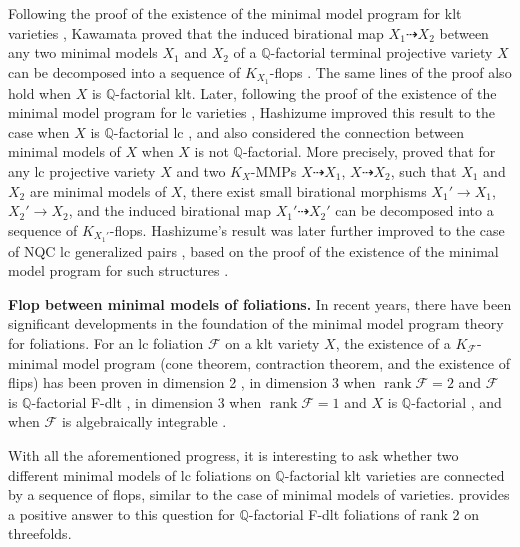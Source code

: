 \documentclass[11pt]{amsart}
\numberwithin{equation}{section}
\newcommand{\rk}{\operatorname{rank}}
\newcommand{\Ff}{\mathcal{F}}
\theoremstyle{definition}
\theoremstyle{definition}
\theoremstyle{definition}
\begin{document}
Following the proof of the existence of the minimal model program for klt varieties \cite{BCHM10}, Kawamata proved that the induced birational map $X_1 \dashrightarrow X_2$ between any two minimal models $X_1$ and $X_2$ of a $\mathbb{Q}$-factorial terminal projective variety $X$ can be decomposed into a sequence of $K_{X_1}$-flops \cite[Theorem 1]{Kaw08}. The same lines of the proof also hold when $X$ is $\mathbb{Q}$-factorial klt. Later, following the proof of the existence of the minimal model program for lc varieties \cite{Bir12, HX13, Has19}, Hashizume improved this result to the case when $X$ is $\mathbb{Q}$-factorial lc \cite{Has20}, and also considered the connection between minimal models of $X$ when $X$ is not $\mathbb{Q}$-factorial. More precisely, \cite[Theorem 1.1]{Has20} proved that for any lc projective variety $X$ and two $K_X$-MMPs $X\dashrightarrow X_1$, $X \dashrightarrow X_2$, such that $X_1$ and $X_2$ are minimal models of $X$, there exist small birational morphisms $X_1' \rightarrow X_1$, $X_2' \rightarrow X_2$, and the induced birational map $X_1' \dashrightarrow X_2'$ can be decomposed into a sequence of $K_{X_1'}$-flops. Hashizume's result was later further improved to the case of NQC lc generalized pairs \cite{Cha24}, based on the proof of the existence of the minimal model program for such structures \cite{HL23, LX23a, LX23b, Xie22}.

\medskip


\noindent\textbf{Flop between minimal models of foliations.} In recent years, there have been significant developments in the foundation of the minimal model program theory for foliations. For an lc foliation $ \mathcal{F} $ on a klt variety $ X $, the existence of a $ K_{\mathcal{F}} $-minimal model program (cone theorem, contraction theorem, and the existence of flips) has been proven in dimension 2 \cite{McQ08, Bru15}, in dimension 3 when $\rk\Ff=2$ and $ \mathcal{F} $ is $\mathbb{Q}$-factorial F-dlt \cite{Spi20, CS21, SS22}, in dimension 3 when $\rk\Ff=1$ and $ X $ is $\mathbb{Q}$-factorial \cite{CS20}, and when $ \mathcal{F} $ is algebraically integrable \cite{CHLX23, LMX24b, CHLMSSX24}.

With all the aforementioned progress, it is interesting to ask whether two different minimal models of lc foliations on $\mathbb{Q}$-factorial klt varieties are connected by a sequence of flops, similar to the case of minimal models of varieties. \cite[Theorem 1.1]{JV23} provides a positive answer to this question for $\mathbb{Q}$-factorial F-dlt foliations of rank 2 on threefolds.
\end{document}
